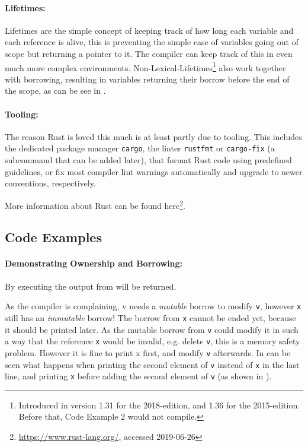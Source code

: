 \paragraph{Lifetimes:}\label{sec:lifetimes}
Lifetimes are the simple concept of keeping track of how long each variable and
each reference is alive, this is preventing the simple case of variables
going out of scope but returning a pointer to it. The compiler can keep track
of this in even much more complex environments.
Non-Lexical-Lifetimes\footnote{Introduced in version 1.31 for the 2018-edition,
and 1.36 for the 2015-edition. Before that, Code Example 2 would not compile.}
also work together with borrowing, resulting in variables returning their
borrow before the end of the scope, as can be see in .

\paragraph{Tooling:}\label{sec:tools}

The reason Rust is loved \cite{rustloved} this much is at least partly due to
tooling. This includes the dedicated package manager \verb|cargo|, the linter
\verb|rustfmt| or \verb|cargo-fix| (a subcommand that can be added later), that
format Rust code using predefined guidelines, or fix most compiler lint warnings
automatically and upgrade to newer conventions, respectively.

More information about Rust can be found
here\footnote{\url{https://www.rust-lang.org/}, accessed 2019-06-26}.




\subsection{Code Examples}\label{sec:examples}

\paragraph{Demonstrating Ownership and Borrowing:}

By executing  the output from  will be returned.



As the compiler is complaining, v needs a {\em mutable} borrow to modify
\verb|v|, however \verb|x| still has an {\em immutable} borrow! The borrow from
\verb|x| cannot be ended yet, because it should be printed later. As the mutable
borrow from \verb|v| could modify it in such a way that the reference \verb|x|
would be invalid, e.g. delete \verb|v|, this is a memory safety problem.
However it is fine to print x first, and modify \verb|v| afterwards. In
 can be seen what happens when printing the second element of
\verb|v| instead of \verb|x| in the last line, and printing \verb|x| before
adding the second element of \verb|v| (as shown in ).

